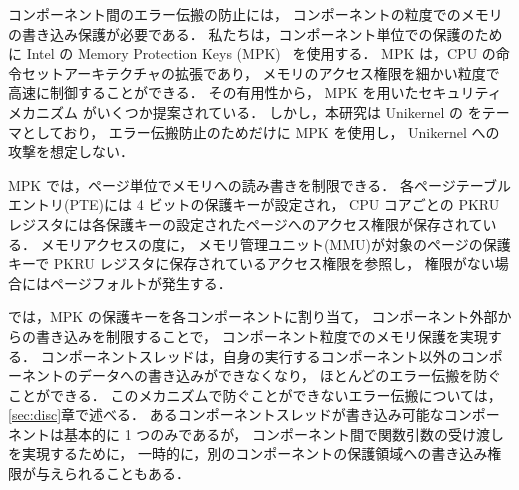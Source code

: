 コンポーネント間のエラー伝搬の防止には，
コンポーネントの粒度でのメモリの書き込み保護が必要である．
私たちは，コンポーネント単位での保護のために Intel の Memory Protection Keys (MPK)~\cite{Intel-MPK}
を使用する．
MPK は，CPU の命令セットアーキテクチャの拡張であり，
メモリのアクセス権限を細かい粒度で高速に制御することができる．
その有用性から，
MPK を用いたセキュリティメカニズム
がいくつか提案されている\cite{ParkEtAl-libmpk,HedayatiEtAl-Hodor,Schrammel-Donky,SartakovEtAl-ASPLOS21,LefeuvreEtAl-FlexOS}．
しかし，本研究は Unikernel の \rr をテーマとしており，
エラー伝搬防止のためだけに MPK を使用し，
Unikernel への攻撃を想定しない．


MPK では，ページ単位でメモリへの読み書きを制限できる．
各ページテーブルエントリ(PTE)には 4 ビットの保護キーが設定され，
CPU コアごとの PKRU レジスタには各保護キーの設定されたページへのアクセス権限が保存されている．
メモリアクセスの度に，
メモリ管理ユニット(MMU)が対象のページの保護キーで PKRU レジスタに保存されているアクセス権限を参照し，
権限がない場合にはページフォルトが発生する．

\sysname では，MPK の保護キーを各コンポーネントに割り当て，
コンポーネント外部からの書き込みを制限することで，
コンポーネント粒度でのメモリ保護を実現する．
コンポーネントスレッドは，自身の実行するコンポーネント以外のコンポーネントのデータへの書き込みができなくなり，
ほとんどのエラー伝搬を防ぐことができる．
このメカニズムで防ぐことができないエラー伝搬については，\ref{sec:disc}章で述べる．
あるコンポーネントスレッドが書き込み可能なコンポーネントは基本的に 1 つのみであるが，
コンポーネント間で関数引数の受け渡しを実現するために，
一時的に，別のコンポーネントの保護領域への書き込み権限が与えられることもある．

